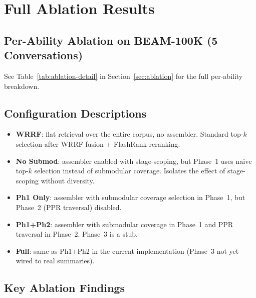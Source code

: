 \documentclass[11pt]{article}
\begin{document}
\section{Full Ablation Results}
\label{app:ablation}

\subsection{Per-Ability Ablation on BEAM-100K (5 Conversations)}

See Table~\ref{tab:ablation-detail} in Section~\ref{sec:ablation} for
the full per-ability breakdown.

\subsection{Configuration Descriptions}

\begin{itemize}
  \item \textbf{WRRF}: flat retrieval over the entire corpus, no
    assembler.  Standard top-$k$ selection after WRRF fusion +
    FlashRank reranking.

  \item \textbf{No Submod}: assembler enabled with stage-scoping, but
    Phase~1 uses naive top-$k$ selection instead of submodular
    coverage.  Isolates the effect of stage-scoping without diversity.

  \item \textbf{Ph1 Only}: assembler with submodular coverage
    selection in Phase~1, but Phase~2 (PPR traversal) disabled.

  \item \textbf{Ph1+Ph2}: assembler with submodular coverage in
    Phase~1 and PPR traversal in Phase~2.  Phase~3 is a stub.

  \item \textbf{Full}: same as Ph1+Ph2 in the current implementation
    (Phase~3 not yet wired to real summaries).
\end{itemize}

\subsection{Key Ablation Findings}
\end{document}
